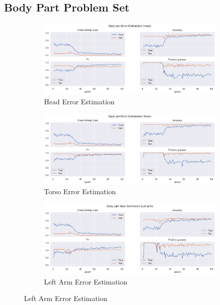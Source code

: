 \subsection{Body Part Problem Set}

\begin{figure}[ht]
  \centering
  \begin{subfigure}[b]{0.9\linewidth}
      \centering
      \includegraphics[width=\textwidth]{figures/Results/v2_bs_40_is_64_e_100/bp/Head_ErrorEstimation.png}
      \caption{Head Error Estimation}
      \label{fig:head_lb_ee}
  \end{subfigure}
  \hfill
  \begin{subfigure}[b]{0.9\linewidth}
      \centering
      \includegraphics[width=\textwidth]{figures/Results/v2_bs_40_is_64_e_100/bp/Torso_ErrorEstimation.png}
      \caption{Torso Error Estimation}
      \label{fig:torso_lb_ee}
  \end{subfigure}
  \hfill
  \begin{subfigure}[b]{0.9\linewidth}
      \centering
      \includegraphics[width=\textwidth]{figures/Results/v2_bs_40_is_64_e_100/bp/Left arm_ErrorEstimation.png}
      \caption{Left Arm Error Estimation}
      \label{fig:lear_lb_ee}
  \end{subfigure}
\end{figure}


